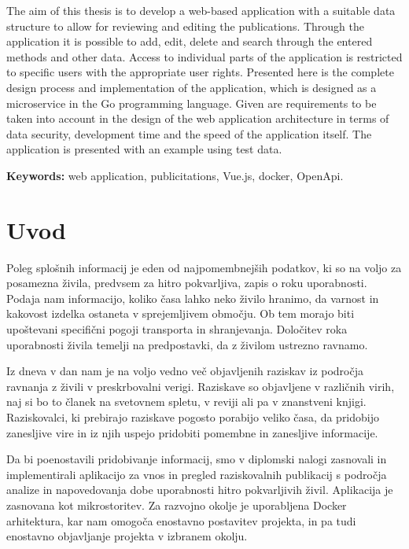 \documentclass[a4paper, 12pt]{book}
\newcommand{\tkeywordsEn}{web application, publicitations, Vue.js, docker, OpenApi}
\newcommand{\clearemptydoublepage}{\newpage{\pagestyle{empty}\cleardoublepage}}
\begin{document}
The aim of this thesis is to develop a web-based application with a suitable data structure to allow for reviewing and editing the publications. Through the application it is possible to add, edit, delete and search through the entered methods and other data. Access to individual parts of the application is restricted to specific users with the appropriate user rights. Presented here is the complete design process and implementation of the application, which is designed as a microservice in the Go programming language. Given are requirements to be taken into account in the design of the web application architecture in terms of data security, development time and the speed of the application itself. The application is presented with an example using test data.
\bigskip

\noindent\textbf{Keywords:} \tkeywordsEn.
\clearemptydoublepage

\mainmatter
\setcounter{page}{1}
\pagestyle{fancy}


\chapter{Uvod}

Poleg splošnih informacij je eden od najpomembnejših podatkov, ki so na voljo za posamezna živila, predvsem za hitro pokvarljiva, zapis o roku uporabnosti. Podaja nam informacijo, koliko časa lahko neko živilo hranimo, da varnost in kakovost izdelka ostaneta v sprejemljivem območju. Ob tem morajo biti upoštevani specifični pogoji transporta in shranjevanja. Določitev roka uporabnosti živila temelji na predpostavki, da z živilom ustrezno ravnamo.

Iz dneva v dan nam je na voljo vedno več objavljenih raziskav iz področja ravnanja z živili v preskrbovalni verigi. Raziskave so objavljene v različnih virih, naj si bo to članek na svetovnem spletu, v reviji ali pa v znanstveni knjigi. Raziskovalci, ki prebirajo raziskave pogosto porabijo veliko časa, da pridobijo zanesljive vire in iz njih uspejo pridobiti pomembne in zanesljive informacije.

Da bi poenostavili pridobivanje informacij, smo v diplomski nalogi zasnovali in implementirali aplikacijo za vnos in pregled raziskovalnih publikacij s področja analize in napovedovanja dobe uporabnosti hitro pokvarljivih živil. Aplikacija je zasnovana kot mikrostoritev. Za razvojno okolje je uporabljena Docker arhitektura, kar nam omogoča enostavno postavitev projekta, in pa tudi enostavno objavljanje projekta v izbranem okolju.
\end{document}
